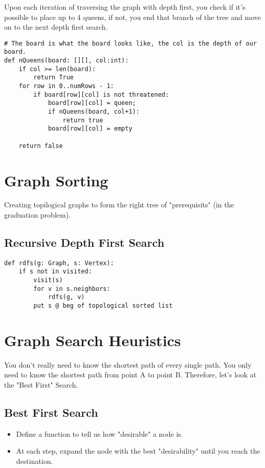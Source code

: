 \documentclass{article}
\begin{document}
Upon each iteration of traversing the graph with depth first, you check if it's possible to place up to 4 queens, if not, you end that branch of the tree and move on to the next depth first search.

\begin{verbatim}
# The board is what the board looks like, the col is the depth of our board.
def nQueens(board: [][], col:int):
    if col >= len(board):
        return True
    for row in 0..numRows - 1:
        if board[row][col] is not threatened:
            board[row][col] = queen;
            if nQueens(board, col+1):
                return true
            board[row][col] = empty

    return false
\end{verbatim}

\section{Graph Sorting}
\label{sec:orgde06f0c}
Creating topilogical graphs to form the right tree of "prerequisits" (in the graduation problem).
\subsection{Recursive Depth First Search}
\label{sec:orge40ca79}
\begin{verbatim}
def rdfs(g: Graph, s: Vertex):
    if s not in visited:
        visit(s)
        for v in s.neighbors:
            rdfs(g, v)
        put s @ beg of topological sorted list
\end{verbatim}

\section{Graph Search Heuristics}
\label{sec:org7cd1e51}
You don't really need to know the shortest path of every single path. You only need to know the shortest 
path from point A to point B. Therefore, let's look at the "Best First" Search.

\subsection{Best First Search}
\label{sec:orga5ef182}
\begin{itemize}
\item Define a function to tell us how "desirable" a node is.
\item At each step, expand the node with the best "desirability" until you reach the destination.
\end{itemize}
\end{document}
